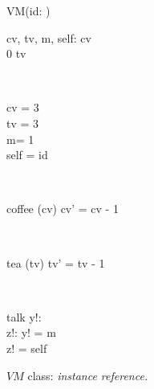 \begin{figure}[H]
\centering
\begin{class}{VM(id: \integer)}
\\
\begin{state}
cv, tv, m, self: \integer
{} \leq  cv 
\\
0 \leq  tv 
\end{state} 
\\
\begin{init}
cv = 3
\\tv = 3
\\ m= 1
\\self = id
\end{init} 
\\
\begin{op}{coffee}
\Delta (cv)
\ST
cv' = cv - 1
\end{op}
\\
\begin{op}{tea}
\Delta (tv)
\ST
tv' = tv - 1
\end{op}
\\
\begin{op}{talk}
y!: \integer
\\z!: \integer
\ST
y! = m
\\z! = self
\end{op}
\end{class}
\caption{$VM$ class: \textit{instance reference.}}
\label{oz_vm_reference_name}
\end{figure}